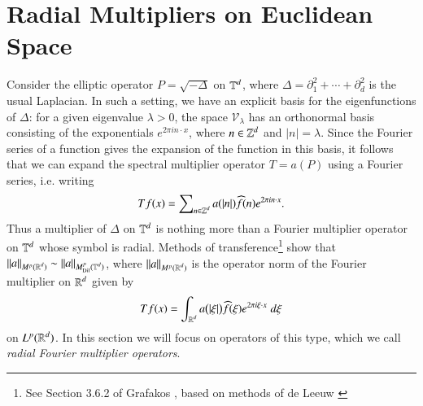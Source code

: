 
%

%

\chapter{Radial Multipliers on Euclidean Space} \label{sec:radmult}

Consider the elliptic operator $P = \sqrt{-\Delta}$ on $\operatorname{\mathbb{T}}^d$, where $\Delta = \partial_1^2 + \cdots + \partial_d^2$ is the usual Laplacian. In such a setting, we have an explicit basis for the eigenfunctions of $\Delta$: for a given eigenvalue $\lambda > 0$, the space $\mathcal{V}_\lambda$ has an orthonormal basis consisting of the exponentials $e^{2 \pi i n \cdot x}$, where $n \in \operatorname{\mathbb{Z}}^d$ and $|n| = \lambda$. Since the Fourier series of a function gives the expansion of the function in this basis, it follows that we can expand the spectral multiplier operator $T = a(P)$ using a Fourier series, i.e. writing
%
\begin{equation}
  Tf(x) = \sum\nolimits_{n \in \operatorname{\mathbb{Z}}^d} a( |n| ) \widehat{f}(n) e^{2 \pi i n \cdot x}.
\end{equation}
%
Thus a multiplier of $\Delta$ on $\operatorname{\mathbb{T}}^d$ is nothing more than a Fourier multiplier operator on $\operatorname{\mathbb{T}}^d$ whose symbol is radial. Methods of transference\footnote{See Section 3.6.2 of Grafakos \cite{Grafakos}, based on methods of de Leeuw \cite{deLeeuw}} show that $\| a \|_{M^p(\operatorname{\mathbb{R}}^d)} \sim \| a \|_{M^p_{\text{Dil}}(\operatorname{\mathbb{T}}^d)}$, where $\| a \|_{M^p(\operatorname{\mathbb{R}}^d)}$ is the operator norm of the Fourier multiplier on $\operatorname{\mathbb{R}}^d$ given by
%
\begin{equation}
  Tf(x) = \int_{\operatorname{\mathbb{R}}^d} a \big(|\xi| \big) \widehat{f}(\xi) e^{2 \pi i \xi \cdot x}\; d\xi 
\end{equation}
%
on $L^p(\operatorname{\mathbb{R}}^d)$. In this section we will focus on operators of this type, which we call \emph{radial Fourier multiplier operators}.

